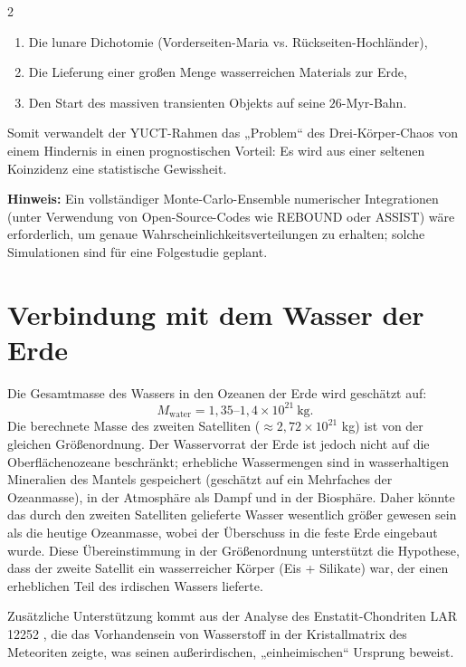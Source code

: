 \documentclass[11pt,a4paper]{article}
\begin{document}
\begin{multicols}{2}
		\begin{enumerate}
			\item Die lunare Dichotomie (Vorderseiten-Maria vs. Rückseiten-Hochländer),
			\item Die Lieferung einer großen Menge wasserreichen Materials zur Erde,
			\item Den Start des massiven transienten Objekts auf seine \(26\)-Myr-Bahn.
		\end{enumerate}
		
		Somit verwandelt der YUCT-Rahmen das „Problem“ des Drei‑Körper‑Chaos
		von einem Hindernis in einen prognostischen Vorteil: Es wird aus einer seltenen
		Koinzidenz eine statistische Gewissheit.
		
		\vspace{0.2cm}
		\noindent
		\textbf{Hinweis:} Ein vollständiger Monte-Carlo-Ensemble numerischer Integrationen
		(unter Verwendung von Open-Source-Codes wie REBOUND oder ASSIST) wäre erforderlich,
		um genaue Wahrscheinlichkeitsverteilungen zu erhalten; solche Simulationen sind
		für eine Folgestudie geplant.
		
		
		\section{Verbindung mit dem Wasser der Erde}
		
		Die Gesamtmasse des Wassers in den Ozeanen der Erde wird geschätzt auf:
		\[
		M_{\text{water}} = 1,35\text{–}1,4 \times 10^{21}\ \text{kg}.
		\]
		Die berechnete Masse des zweiten Satelliten (\(\approx 2,72 \times 10^{21}\) kg) ist von der gleichen Größenordnung. Der Wasservorrat der Erde ist jedoch nicht auf die Oberflächenozeane beschränkt; erhebliche Wassermengen sind in wasserhaltigen Mineralien des Mantels gespeichert (geschätzt auf ein Mehrfaches der Ozeanmasse), in der Atmosphäre als Dampf und in der Biosphäre. Daher könnte das durch den zweiten Satelliten gelieferte Wasser wesentlich größer gewesen sein als die heutige Ozeanmasse, wobei der Überschuss in die feste Erde eingebaut wurde. Diese Übereinstimmung in der Größenordnung unterstützt die Hypothese, dass der zweite Satellit ein wasserreicher Körper (Eis + Silikate) war, der einen erheblichen Teil des irdischen Wassers lieferte.
		
		Zusätzliche Unterstützung kommt aus der Analyse des Enstatit-Chondriten LAR 12252 \cite{Gardiner2025}, die das Vorhandensein von Wasserstoff in der Kristallmatrix des Meteoriten zeigte, was seinen außerirdischen, „einheimischen“ Ursprung beweist.
		

\end{multicols}
\end{document}
